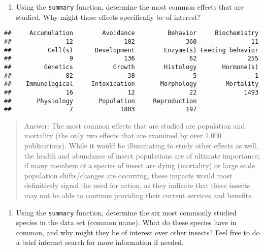 \documentclass[]{article}
\newenvironment{Shaded}{\begin{snugshade}}{\end{snugshade}}
\newcommand{\CommentTok}[1]{\textcolor[rgb]{0.56,0.35,0.01}{\textit{#1}}}
\newcommand{\KeywordTok}[1]{\textcolor[rgb]{0.13,0.29,0.53}{\textbf{#1}}}
\newcommand{\NormalTok}[1]{#1}
\newcommand{\OperatorTok}[1]{\textcolor[rgb]{0.81,0.36,0.00}{\textbf{#1}}}
\providecommand{\tightlist}{%
  \setlength{\itemsep}{0pt}\setlength{\parskip}{0pt}}
\begin{document}
\begin{enumerate}
\def\labelenumi{\arabic{enumi}.}
\setcounter{enumi}{5}
\tightlist
\item
  Using the \texttt{summary} function, determine the most common effects
  that are studied. Why might these effects specifically be of interest?
\end{enumerate}

\begin{Shaded}
\end{Shaded}

\begin{verbatim}
##     Accumulation        Avoidance         Behavior     Biochemistry 
##               12              102              360               11 
##          Cell(s)      Development        Enzyme(s) Feeding behavior 
##                9              136               62              255 
##         Genetics           Growth        Histology       Hormone(s) 
##               82               38                5                1 
##    Immunological     Intoxication       Morphology        Mortality 
##               16               12               22             1493 
##       Physiology       Population     Reproduction 
##                7             1803              197
\end{verbatim}

\begin{quote}
Answer: The most common effects that are studied are population and
mortality (the only two effects that are examined by over 1,000
publications). While it would be illuminating to study other effects as
well, the health and abundance of insect populations are of ultimate
importance; if many members of a species of insect are dying (mortality)
or large scale population shifts/changes are occurring, these impacts
would most definitively signal the need for action, as they indicate
that these insects may not be able to continue providing their current
services and benefits.
\end{quote}

\begin{enumerate}
\def\labelenumi{\arabic{enumi}.}
\setcounter{enumi}{6}
\tightlist
\item
  Using the \texttt{summary} function, determine the six most commonly
  studied species in the data set (common name). What do these species
  have in common, and why might they be of interest over other insects?
  Feel free to do a brief internet search for more information if
  needed.
\end{enumerate}
\end{document}
